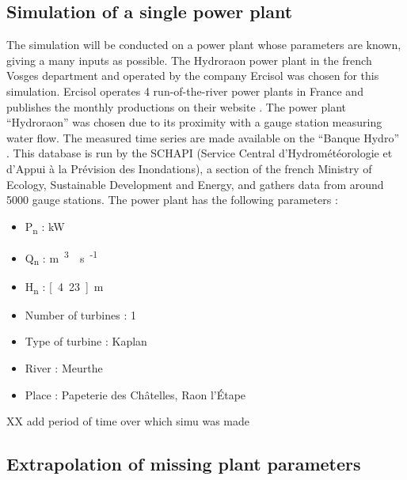 \subsection{Simulation of a single power plant}
\label{sub:metho_single}
The simulation will be conducted on a power plant whose parameters are known, giving a many inputs as possible. The Hydroraon power plant in the french Vosges department and operated by the company Ercisol was chosen for this simulation. Ercisol operates 4 run-of-the-river power plants in France and publishes the monthly productions on their website \cite{ercisol}. The power plant ``Hydroraon'' was chosen due to its proximity with a gauge station measuring water flow. The measured time series are made available on the ``Banque Hydro'' \cite{eaufrance}. This database is run by the SCHAPI (Service Central d'Hydrométéorologie et d'Appui à la Prévision des Inondations), a section of the french Ministry of Ecology, Sustainable Development and Energy, and gathers data from around 5000 gauge stations. \newline
The power plant has the following parameters :
\begin{itemize}
 \item P\textsubscript{n} \tabto{4cm}: \unit[400]{kW}
 \item Q\textsubscript{n} \tabto{4cm}: \unit[12]{m\textsuperscript{3}\textperiodcentered s\textsuperscript{-1}}
 \item H\textsubscript{n} \tabto{4cm}: \unit[4.23]{m}
 \item Number of turbines \tabto{4cm}: 1
 \item Type of turbine \tabto{4cm}: Kaplan
 \item River \tabto{4cm}: Meurthe
 \item Place \tabto{4cm}: Papeterie des Châtelles, Raon l'Étape
\end{itemize}

XX add period of time over which simu was made

\subsection{Extrapolation of missing plant parameters}

